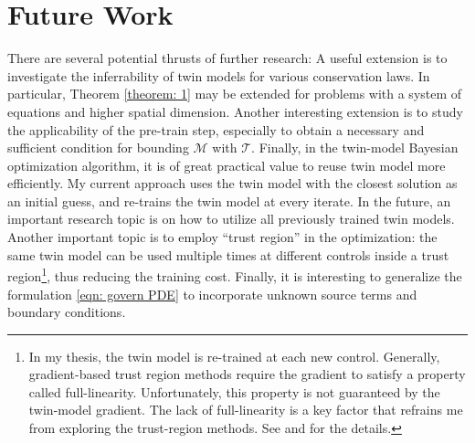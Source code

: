 \section{Future Work}
There are several potential thrusts of further research: 
A useful extension is to investigate the
inferrability of twin models for various conservation laws. In particular,
Theorem \ref{theorem: 1} may be extended for problems with a
system of equations and higher spatial dimension. Another interesting extension
is to study the applicability of the pre-train step, especially to
obtain a necessary and sufficient condition for bounding $\mathcal{M}$
with $\mathcal{T}$. Finally, in the twin-model Bayesian optimization algorithm, 
it is of great practical value to reuse twin model more efficiently.
My current approach uses the twin model with the closest solution as an initial guess,
and re-trains the twin model at every iterate. In the future, an important
research topic is on how to utilize all previously trained twin models. Another important topic 
is to employ ``trust region'' in the optimization: the same twin model can be used multiple times
at different controls inside a trust region\footnote{In my thesis,
the twin model is re-trained at each new control. Generally, gradient-based
trust region methods require the gradient to satisfy a property called full-linearity.
Unfortunately, this property is not guaranteed 
by the twin-model gradient. The lack of full-linearity is a key factor
that refrains me from exploring the trust-region methods. See 
\cite{trustregionconn} and \cite{trustregionwild} for the details.}, thus reducing
the training cost.
Finally, it is interesting to generalize the formulation \eqref{eqn: govern PDE} to
incorporate unknown source terms and boundary conditions.\\

